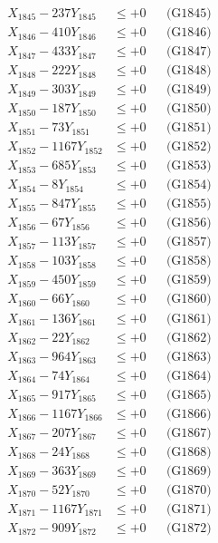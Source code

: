 \documentclass[a4paper,10pt]{article}
\begin{document}
{\begin{align}
X_{1845} - 237Y_{1845} &\leq +0 && \text{(G1845)} \\
X_{1846} - 410Y_{1846} &\leq +0 && \text{(G1846)} \\
X_{1847} - 433Y_{1847} &\leq +0 && \text{(G1847)} \\
X_{1848} - 222Y_{1848} &\leq +0 && \text{(G1848)} \\
X_{1849} - 303Y_{1849} &\leq +0 && \text{(G1849)} \\
X_{1850} - 187Y_{1850} &\leq +0 && \text{(G1850)} \\
\allowbreak
X_{1851} - 73Y_{1851} &\leq +0 && \text{(G1851)} \\
X_{1852} - 1167Y_{1852} &\leq +0 && \text{(G1852)} \\
X_{1853} - 685Y_{1853} &\leq +0 && \text{(G1853)} \\
X_{1854} - 8Y_{1854} &\leq +0 && \text{(G1854)} \\
X_{1855} - 847Y_{1855} &\leq +0 && \text{(G1855)} \\
X_{1856} - 67Y_{1856} &\leq +0 && \text{(G1856)} \\
X_{1857} - 113Y_{1857} &\leq +0 && \text{(G1857)} \\
X_{1858} - 103Y_{1858} &\leq +0 && \text{(G1858)} \\
X_{1859} - 450Y_{1859} &\leq +0 && \text{(G1859)} \\
X_{1860} - 66Y_{1860} &\leq +0 && \text{(G1860)} \\
\allowbreak
X_{1861} - 136Y_{1861} &\leq +0 && \text{(G1861)} \\
X_{1862} - 22Y_{1862} &\leq +0 && \text{(G1862)} \\
X_{1863} - 964Y_{1863} &\leq +0 && \text{(G1863)} \\
X_{1864} - 74Y_{1864} &\leq +0 && \text{(G1864)} \\
X_{1865} - 917Y_{1865} &\leq +0 && \text{(G1865)} \\
X_{1866} - 1167Y_{1866} &\leq +0 && \text{(G1866)} \\
X_{1867} - 207Y_{1867} &\leq +0 && \text{(G1867)} \\
X_{1868} - 24Y_{1868} &\leq +0 && \text{(G1868)} \\
X_{1869} - 363Y_{1869} &\leq +0 && \text{(G1869)} \\
X_{1870} - 52Y_{1870} &\leq +0 && \text{(G1870)} \\
\allowbreak
X_{1871} - 1167Y_{1871} &\leq +0 && \text{(G1871)} \\
X_{1872} - 909Y_{1872} &\leq +0 && \text{(G1872)} \\

\end{align}}
\end{document}
